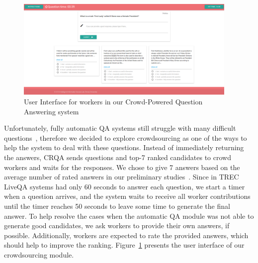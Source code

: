 \documentclass[letterpaper]{article}
\begin{document}
\begin{figure}[h!t]
	\centering
	\includegraphics[width=0.95\textwidth]{img/crowd_ui}
	\caption{User Interface for workers in our Crowd-Powered Question Answering system}
	\label{fig:crowd_ui}
\end{figure}

Unfortunately, fully automatic QA systems still struggle with many difficult questions~\cite{overviewliveqa15}, therefore we decided to explore crowdsourcing as one of the ways to help the system to deal with these questions.
Instead of immediately returning the answers, CRQA sends questions and top-7 ranked candidates to crowd workers and waits for the responses.
We chose to give 7 answers based on the average number of rated answers in our preliminary studies~\cite{savenkov_crowdsourcing2016a}.
Since in TREC LiveQA systems had only 60 seconds to answer each question, we start a timer when a question arrives, and the system waits to receive all worker contributions until the timer reaches 50 seconds to leave some time to generate the final answer.
To help resolve the cases when the automatic QA module was not able to generate good candidates, we ask workers to provide their own answers, if possible.
Additionally, workers are expected to rate the provided answers, which should help to improve the ranking.
Figure~\ref{fig:crowd_ui} presents the user interface of our crowdsourcing module.
\end{document}
